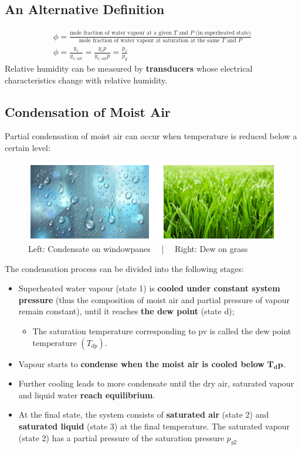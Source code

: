 \documentclass[class=report, crop=false, 12pt,a4paper]{standalone}
\numberwithin{equation}{section}
\begin{document}
\subsection{An Alternative Definition}
\begin{gather}
  \phi = \frac{\text{mole fraction of water vapour at a given $T$ and $P$ (in superheated state)}}{\text{mole fraction of water vapour at saturation at the same $T$ and $P$}} \\[5pt]
  \phi = \frac{y_v}{y_{v,sat}} = \frac{y_vp}{y_{v,sat}p} = \frac{p_v}{p_g}
\end{gather}
Relative humidity can be measured by \textbf{transducers} whose electrical characteristics change with relative humidity.
\subsection{Condensation of Moist Air}
Partial condensation of moist air can occur when temperature is reduced below a certain level:
\begin{figure}[H]
  \centering
  \includegraphics[width = 0.8 \textwidth]{../img/diagram100.png}
  \caption{Left: Condensate on windowpanes \ \ | \ \ Right: Dew on grass}
\end{figure}
The condensation process can be divided into the following stages:
\begin{itemize}[noitemsep]
  \item Superheated water vapour (state 1) is \textbf{cooled under constant system pressure} (thus the composition of moist air and partial pressure of vapour remain constant), until it reaches \textbf{the dew point} (state d);
  \begin{itemize}[noitemsep]
    \item The saturation temperature corresponding to pv is called the dew point temperature $(T_{dp})$.
  \end{itemize}
  \item Vapour starts to \textbf{condense when the moist air is cooled below} $\mathbf{T_dp}$.
  \item Further cooling leads to more condensate until the dry air, saturated vapour and liquid water \textbf{reach equilibrium}.
  \item At the final state, the system consists of \textbf{saturated air} (state 2) and \textbf{saturated liquid} (state 3) at the final temperature. The saturated vapour (state 2) has a partial pressure of the saturation pressure $p_{g2}$
\end{itemize}
\end{document}
